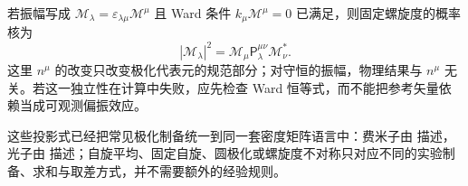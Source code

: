若振幅写成 $\mathcal M_\lambda=\varepsilon_{\lambda\mu}\mathcal M^\mu$ 且 Ward 条件 $k_\mu\mathcal M^\mu=0$ 已满足，则固定螺旋度的概率核为
\begin{equation}
 |\mathcal M_\lambda|^2
 =\mathcal M_\mu
 \mathsf P_\lambda^{\mu\nu}
 \mathcal M_\nu^*.
 \label{eq:helicity-resolved-photon-amplitude-dp9}
\end{equation}
这里 $n^\mu$ 的改变只改变极化代表元的规范部分；对守恒的振幅，物理结果与 $n^\mu$ 无关。若这一独立性在计算中失败，应先检查 Ward 恒等式，而不能把参考矢量依赖当成可观测偏振效应。

这些投影式已经把常见极化制备统一到同一套密度矩阵语言中：费米子由  描述，光子由  描述；自旋平均、固定自旋、圆极化或螺旋度不对称只对应不同的实验制备、求和与取差方式，并不需要额外的经验规则。

